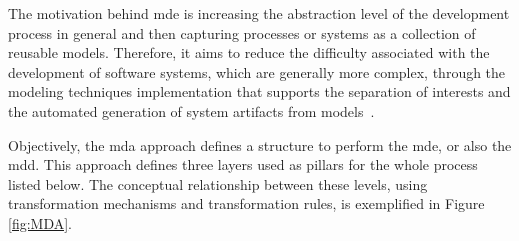 The motivation behind \ac{mde} is increasing the abstraction level of the development process in general and then capturing processes or systems as a collection of reusable models.
Therefore, it aims to reduce the difficulty associated with the development of software systems, which are generally more complex, through the modeling techniques implementation that supports the separation of interests and the automated generation of system artifacts from models~\cite{Batory:2015, Kleppe:2003}.


Objectively, the \ac{mda} approach defines a structure to perform the \ac{mde}, or also the \ac{mdd}.
This approach defines three layers used as pillars for the whole process~\cite{Frantz:2012} listed below.
The conceptual relationship between these levels, using transformation mechanisms and transformation rules, is exemplified in Figure \ref{fig:MDA}.

